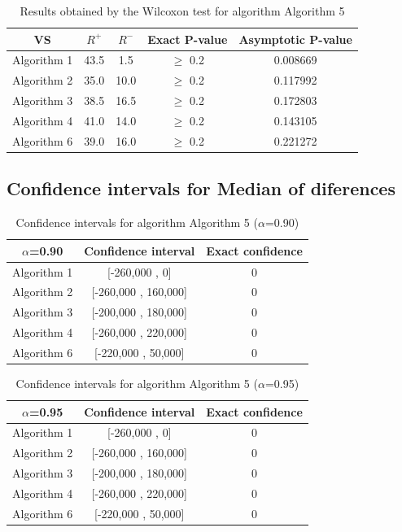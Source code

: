\documentclass[a4paper,10pt]{article}
\begin{document}
\begin{table}[!htp]
\centering\small
\begin{tabular}{
|c|c|c|c|c|}
\hline
 VS & $R^{+}$ & $R^{-}$ & Exact P-value & Asymptotic P-value \\ \hline 
Algorithm 1 & 43.5 & 1.5 & $\geq$ 0.2 & 0.008669\\ \hline 
Algorithm 2 & 35.0 & 10.0 & $\geq$ 0.2 & 0.117992\\ \hline 
Algorithm 3 & 38.5 & 16.5 & $\geq$ 0.2 & 0.172803\\ \hline 
Algorithm 4 & 41.0 & 14.0 & $\geq$ 0.2 & 0.143105\\ \hline 
Algorithm 6 & 39.0 & 16.0 & $\geq$ 0.2 & 0.221272\\ \hline 

\end{tabular}
\caption{Results obtained by the Wilcoxon test for algorithm Algorithm 5}
\end{table}

\subsection{Confidence intervals for Median of diferences}

\begin{table}[!htp]
\centering\small
\begin{tabular}{
|c|c|c|}
\hline
 $\alpha$=0.90 & Confidence interval & Exact confidence \\ \hline 
Algorithm 1 & [-260,000 , 0] & 0\\ \hline 
Algorithm 2 & [-260,000 , 160,000] & 0\\ \hline 
Algorithm 3 & [-200,000 , 180,000] & 0\\ \hline 
Algorithm 4 & [-260,000 , 220,000] & 0\\ \hline 
Algorithm 6 & [-220,000 , 50,000] & 0\\ \hline 

\end{tabular}
\caption{Confidence intervals for algorithm Algorithm 5 ($\alpha$=0.90)}
\end{table}
\begin{table}[!htp]
\centering\small
\begin{tabular}{
|c|c|c|}
\hline
 $\alpha$=0.95 & Confidence interval & Exact confidence \\ \hline 
Algorithm 1 & [-260,000 , 0] & 0\\ \hline 
Algorithm 2 & [-260,000 , 160,000] & 0\\ \hline 
Algorithm 3 & [-200,000 , 180,000] & 0\\ \hline 
Algorithm 4 & [-260,000 , 220,000] & 0\\ \hline 
Algorithm 6 & [-220,000 , 50,000] & 0\\ \hline 

\end{tabular}
\caption{Confidence intervals for algorithm Algorithm 5 ($\alpha$=0.95)}
\end{table}
\end{document}
